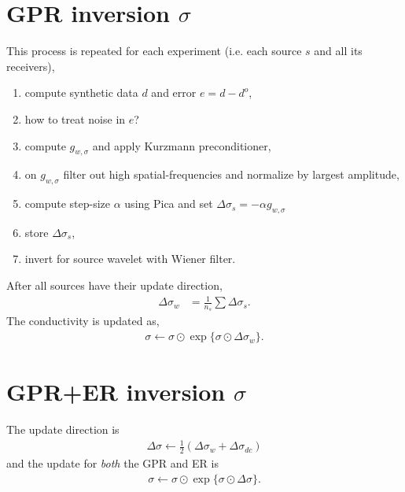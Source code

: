 \documentclass[a4paper,12pt]{article}
\begin{document}
\section*{GPR inversion $\sigma$}
This process is repeated for each experiment (i.e. each source $s$ and all its receivers),
\begin{enumerate}
\item compute synthetic data $d$ and error $e=d-d^o$,
\item \color{red} how to treat noise in $e$?\color{black}
\item compute $g_{w,\sigma}$ and apply Kurzmann preconditioner,
\item on $g_{w,\sigma}$ filter out high spatial-frequencies and normalize by largest amplitude,
\item compute step-size $\alpha$ using Pica and set $\Delta\sigma_s=-\alpha g_{w,\sigma}$
\item store $\Delta\sigma_s$,
\item invert for source wavelet with \color{red} Wiener filter\color{black}.
\end{enumerate}
After all sources have their update direction, 
\begin{align*}
\Delta\sigma_w &= \frac{1}{n_s} \sum\Delta\sigma_s.
\end{align*}
The conductivity is updated as,
\begin{align*}
\sigma\gets\sigma\odot\exp\{\sigma\odot\Delta\sigma_w\}.
\end{align*} 
% 
\section*{GPR+ER inversion $\sigma$}
The update direction is 
\begin{align*}
\Delta\sigma\gets \frac{1}{2} (\Delta\sigma_w + \Delta\sigma_{dc}) 
\end{align*} 
and the update for {\it both} the GPR and ER is
\begin{align*}
\sigma\gets\sigma\odot\exp\{\sigma\odot\Delta\sigma\}.
\end{align*} 
%
% 
% 
\end{document}
